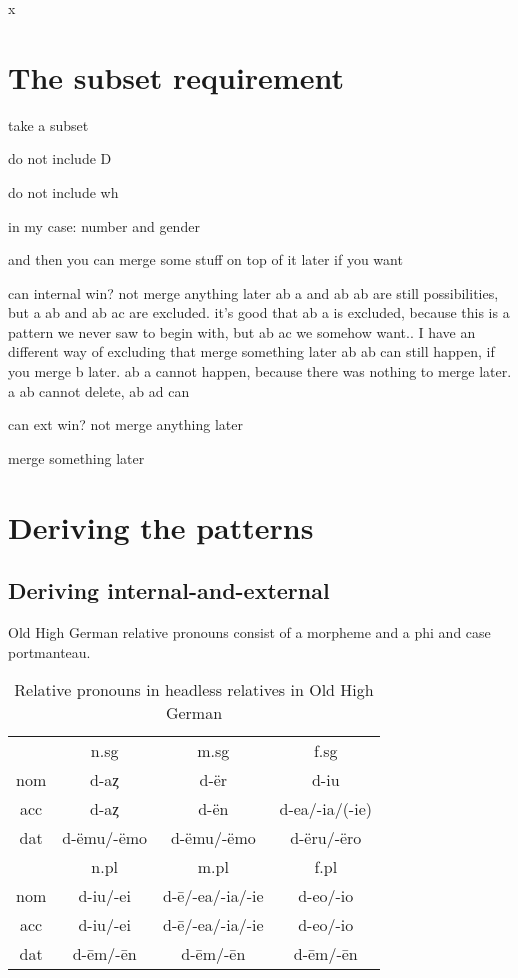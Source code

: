 x

\section{The subset requirement}

take a subset

do not include D

do not include wh

in my case: number and gender

and then you can merge some stuff on top of it later if you want

can internal win?
  not merge anything later
    ab a and ab ab are still possibilities, but a ab and ab ac are excluded. it's good that ab a is excluded, because this is a pattern we never saw to begin with, but ab ac we somehow want.. I have an different way of excluding that
  merge something later
    ab ab can still happen, if you merge b later. ab a cannot happen, because there was nothing to merge later. a ab cannot delete, ab ad can

can ext win?
  not merge anything later

  merge something later





\section{Deriving the patterns}

\subsection{Deriving internal-and-external}

Old High German relative pronouns consist of a morpheme  and a phi and case portmanteau.

\begin{table}[H]\label{tbl:paradigmohg}
 \center
 \caption {Relative pronouns in headless relatives in Old High German}
  \begin{tabular}{cccc}
  \toprule
       & \ac{n}.\ac{sg} & \ac{m}.\ac{sg}  & \ac{f}.\ac{sg} \\
        \cmidrule{2-4}
  \ac{nom} & d-aȥ           & d-ër          & d-iu      \\
  \ac{acc} & d-aȥ        & d-ën      & d-ea/-ia/(-ie) \\
  \ac{dat} & d-ëmu/-ëmo     & d-ëmu/-ëmo   & d-ëru/-ëro   \\
  \bottomrule
         & \ac{n}.\ac{pl} & \ac{m}.\ac{pl}   & \ac{f}.\ac{pl} \\
          \cmidrule{2-4}
    \ac{nom}  & d-iu/-ei      &  d-ē/-ea/-ia/-ie & d-eo/-io        \\
    \ac{acc}  & d-iu/-ei      &  d-ē/-ea/-ia/-ie & d-eo/-io        \\
    \ac{dat}  & d-ēm/-ēn      &  d-ēm/-ēn        & d-ēm/-ēn        \\
    \bottomrule
  \end{tabular}
\end{table}

